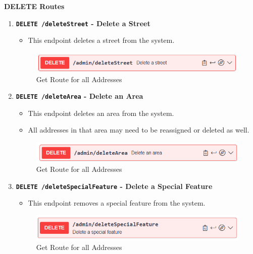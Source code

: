     \textbf{DELETE Routes}
    \begin{enumerate}
        \item \textbf{\texttt{DELETE /deleteStreet} - Delete a Street}
        \begin{itemize}
            \item This endpoint deletes a street from the system.
        \end{itemize} 
        \begin{figure} [H]
            \centering
            \includegraphics [width=1\textwidth] {images/andreas/praxis/deleteStreet.png}
            \caption{Get Route for all Addresses}
        \end{figure}

        \item \textbf{\texttt{DELETE /deleteArea} - Delete an Area}
        \begin{itemize}
            \item This endpoint deletes an area from the system.
            \item All addresses in that area may need to be reassigned or deleted as well.
        \end{itemize} 
        \begin{figure} [H]
            \centering
            \includegraphics [width=1\textwidth] {images/andreas/praxis/deleteArea.png}
            \caption{Get Route for all Addresses}
        \end{figure}

        \item \textbf{\texttt{DELETE /deleteSpecialFeature} - Delete a Special Feature}
        \begin{itemize}
            \item This endpoint removes a special feature from the system.
        \end{itemize} 
        \begin{figure} [H]
            \centering
            \includegraphics [width=1\textwidth] {images/andreas/praxis/deleteSF.png}
            \caption{Get Route for all Addresses}
        \end{figure}


\end{enumerate}
